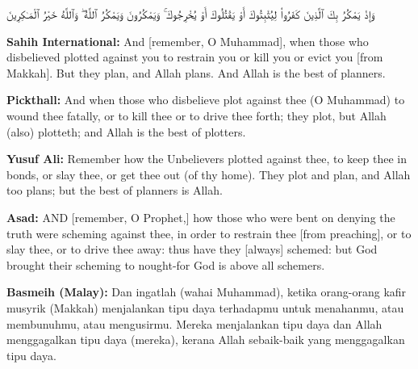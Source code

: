 \documentclass[11pt,a4paper,openany]{book}
\let\textAR\textarabic
\newcommand{\quranverse}[1]{{\centering\Large\textAR{#1}\par}}
\begin{document}
\begin{quranbox}[Qur'an 8:30]
\quranverse{وَإِذْ يَمْكُرُ بِكَ ٱلَّذِينَ كَفَرُوا۟ لِيُثْبِتُوكَ أَوْ يَقْتُلُوكَ أَوْ يُخْرِجُوكَ ۚ وَيَمْكُرُونَ وَيَمْكُرُ ٱللَّهُ ۖ وَٱللَّهُ خَيْرُ ٱلْمَـٰكِرِينَ}

\vspace{6pt}
\noindent\textbf{Sahih International:} And [remember, O Muhammad], when those who disbelieved plotted against you to restrain you or kill you or evict you [from Makkah]. But they plan, and Allah plans. And Allah is the best of planners.

\vspace{4pt}
\noindent\textbf{Pickthall:} And when those who disbelieve plot against thee (O Muhammad) to wound thee fatally, or to kill thee or to drive thee forth; they plot, but Allah (also) plotteth; and Allah is the best of plotters.

\vspace{4pt}
\noindent\textbf{Yusuf Ali:} Remember how the Unbelievers plotted against thee, to keep thee in bonds, or slay thee, or get thee out (of thy home). They plot and plan, and Allah too plans; but the best of planners is Allah.

\vspace{4pt}
\noindent\textbf{Asad:} AND [remember, O Prophet,] how those who were bent on denying the truth were scheming against thee, in order to restrain thee [from preaching], or to slay thee, or to drive thee away: thus have they [always] schemed: but God brought their scheming to nought-for God is above all schemers.

\vspace{4pt}
\noindent\textbf{Basmeih (Malay):} Dan ingatlah (wahai Muhammad), ketika orang-orang kafir musyrik (Makkah) menjalankan tipu daya terhadapmu untuk menahanmu, atau membunuhmu, atau mengusirmu. Mereka menjalankan tipu daya dan Allah menggagalkan tipu daya (mereka), kerana Allah sebaik-baik yang menggagalkan tipu daya.
\end{quranbox}
\end{document}
